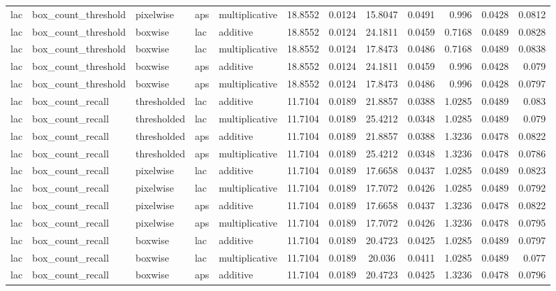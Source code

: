 \begin{table*}[htbp]
\begin{tabular}{@{}lllll rrcrrcr@{}}
lac & box\_count\_threshold & pixelwise & aps & multiplicative & 18.8552 & 0.0124 & 15.8047 & 0.0491 & 0.996 & 0.0428 & 0.0812 \\
lac & box\_count\_threshold & boxwise & lac & additive & 18.8552 & 0.0124 & 24.1811 & 0.0459 & 0.7168 & 0.0489 & 0.0828 \\
lac & box\_count\_threshold & boxwise & lac & multiplicative & 18.8552 & 0.0124 & 17.8473 & 0.0486 & 0.7168 & 0.0489 & 0.0838 \\
lac & box\_count\_threshold & boxwise & aps & additive & 18.8552 & 0.0124 & 24.1811 & 0.0459 & 0.996 & 0.0428 & 0.079 \\
lac & box\_count\_threshold & boxwise & aps & multiplicative & 18.8552 & 0.0124 & 17.8473 & 0.0486 & 0.996 & 0.0428 & 0.0797 \\
lac & box\_count\_recall & thresholded & lac & additive & 11.7104 & 0.0189 & 21.8857 & 0.0388 & 1.0285 & 0.0489 & 0.083 \\
lac & box\_count\_recall & thresholded & lac & multiplicative & 11.7104 & 0.0189 & 25.4212 & 0.0348 & 1.0285 & 0.0489 & 0.079 \\
lac & box\_count\_recall & thresholded & aps & additive & 11.7104 & 0.0189 & 21.8857 & 0.0388 & 1.3236 & 0.0478 & 0.0822 \\
lac & box\_count\_recall & thresholded & aps & multiplicative & 11.7104 & 0.0189 & 25.4212 & 0.0348 & 1.3236 & 0.0478 & 0.0786 \\
lac & box\_count\_recall & pixelwise & lac & additive & 11.7104 & 0.0189 & 17.6658 & 0.0437 & 1.0285 & 0.0489 & 0.0823 \\
lac & box\_count\_recall & pixelwise & lac & multiplicative & 11.7104 & 0.0189 & 17.7072 & 0.0426 & 1.0285 & 0.0489 & 0.0792 \\
lac & box\_count\_recall & pixelwise & aps & additive & 11.7104 & 0.0189 & 17.6658 & 0.0437 & 1.3236 & 0.0478 & 0.0822 \\
lac & box\_count\_recall & pixelwise & aps & multiplicative & 11.7104 & 0.0189 & 17.7072 & 0.0426 & 1.3236 & 0.0478 & 0.0795 \\
lac & box\_count\_recall & boxwise & lac & additive & 11.7104 & 0.0189 & 20.4723 & 0.0425 & 1.0285 & 0.0489 & 0.0797 \\
lac & box\_count\_recall & boxwise & lac & multiplicative & 11.7104 & 0.0189 & 20.036 & 0.0411 & 1.0285 & 0.0489 & 0.077 \\
lac & box\_count\_recall & boxwise & aps & additive & 11.7104 & 0.0189 & 20.4723 & 0.0425 & 1.3236 & 0.0478 & 0.0796 \\

\end{tabular}
\end{table*}
